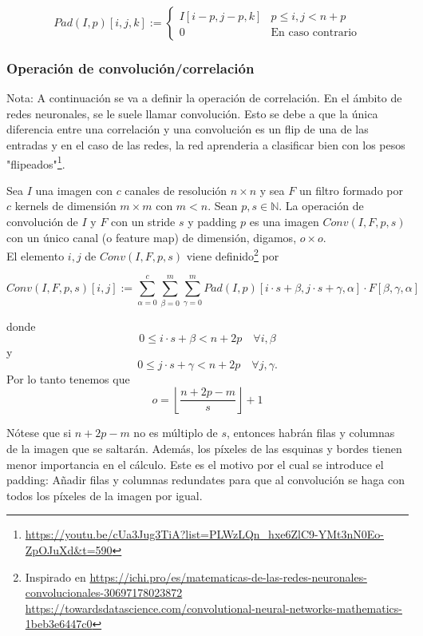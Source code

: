 \documentclass{article}
\begin{document}
$$Pad(I,p)[i,j,k]:=\begin{cases}
  I[i-p,j-p,k] & p\leq i,j<n+p\\
  0 & \text{En caso contrario}
\end{cases} $$


\subsubsection{Operación de convolución/correlación}

Nota: A continuación se va a definir la operación de correlación. En el ámbito de redes neuronales, se le suele llamar convolución. Esto se debe a que la única diferencia entre una correlación y una convolución es un flip de una de las entradas y en el caso de las redes, la red aprenderia a clasificar bien con los pesos "flipeados"\footnote{\url{https://youtu.be/cUa3Jug3TiA?list=PLWzLQn_hxe6ZlC9-YMt3nN0Eo-ZpOJuXd&t=590}}.

Sea $I$ una imagen con $c$ canales de resolución $n\times n$ y sea $F$ un filtro formado por $c$ kernels de dimensión $m\times m$ con $m<n$. Sean $p,s\in \mathbb{N}$. La operación de convolución de $I$ y $F$ con un stride $s$ y padding $p$ es una imagen $Conv(I,F,p,s)$ con un único canal (o feature map) de dimensión, digamos, $o\times o$.\\


El elemento $i,j$ de $Conv(I,F,p,s)$ viene definido\footnote{Inspirado en \url{https://ichi.pro/es/matematicas-de-las-redes-neuronales-convolucionales-30697178023872}  \url{https://towardsdatascience.com/convolutional-neural-networks-mathematics-1beb3e6447c0}} por


$$Conv(I,F,p,s)[i,j]:=\sum_{\alpha=0}^c \sum_{\beta=0}^m \sum_{\gamma=0}^m Pad(I,p)[i\cdot s+\beta,j\cdot s+\gamma,\alpha]\cdot  F[\beta,\gamma,\alpha]$$

donde 
$$0\leq i\cdot s+\beta <n+2p \quad \forall i,\beta $$
y
$$0\leq j\cdot s+\gamma <n+2p \quad \forall j,\gamma .$$
Por lo tanto tenemos que  
$$o=\left\lfloor \frac{n+2p-m}{s}\right\rfloor+1$$

Nótese que si $n+2p-m$ no es múltiplo de $s$, entonces habrán filas y columnas de la imagen que se saltarán. Además, los píxeles de las esquinas y bordes tienen menor importancia en el cálculo. Este es el motivo por el cual se introduce el padding: Añadir filas y columnas redundates para que al convolución se haga con todos los píxeles de la imagen por igual.\\
\end{document}
